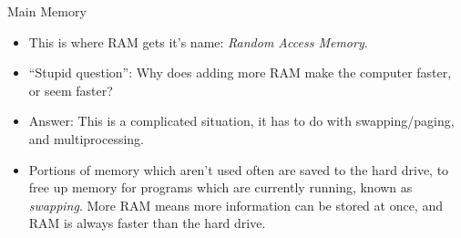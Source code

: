 \documentclass[graphics]{beamer}
\begin{document}
\begin{frame}{Main Memory}
{\begin{itemize}
        \item This is where RAM gets it's name: \textit{Random Access Memory}.
    \end{itemize}
}
 {
    \begin{itemize}
        \item ``Stupid question'': Why does adding more RAM make the computer faster, or seem faster?
        \item Answer: This is a complicated situation, it has to do with swapping/paging, and multiprocessing.
        \item Portions of memory which aren't used often are saved to the hard drive, to free up memory for programs which are currently running, known as \textit{swapping}. More RAM means more information can be stored at once, and RAM is always faster than the hard drive.
    \end{itemize}
}
\end{frame}
\end{document}
